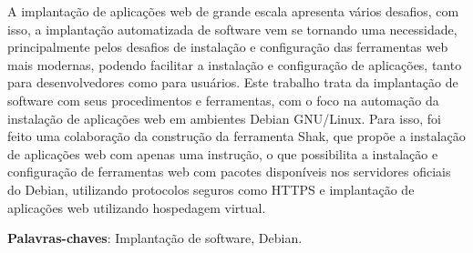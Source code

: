\begin{resumo}

A implantação de aplicações web de grande escala apresenta vários desafios, com
isso, a implantação automatizada de software vem se tornando uma necessidade,
principalmente pelos desafios de instalação e configuração das ferramentas web
mais modernas, podendo facilitar a instalação e configuração de aplicações, tanto para
desenvolvedores como para usuários. Este trabalho trata da implantação de software
com seus procedimentos e ferramentas, com o foco na automação da instalação de 
aplicações web em ambientes Debian GNU/Linux. Para isso, foi feito uma colaboração da
construção da ferramenta Shak, que propõe a instalação de aplicações web com
apenas uma instrução, o que possibilita a instalação e configuração de ferramentas
web com pacotes disponíveis nos servidores oficiais do Debian, utilizando
protocolos seguros como HTTPS e implantação de aplicações web utilizando hospedagem virtual.
 \vspace{\onelineskip}

 \noindent
 \textbf{Palavras-chaves}: Implantação de software, Debian.
\end{resumo}
